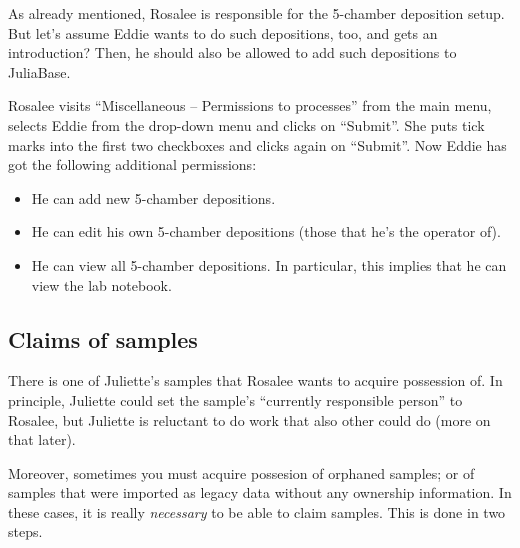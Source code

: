 \documentclass[a4paper,11pt,english]{sphinxmanual}
\begin{document}
As already mentioned, Rosalee is responsible for the 5-chamber deposition
setup.  But let's assume Eddie wants to do such depositions, too, and gets an
introduction?  Then, he should also be allowed to add such depositions to
JuliaBase.

Rosalee visits “Miscellaneous – Permissions to processes” from the main menu,
selects Eddie from the drop-down menu and clicks on “Submit”.  She puts tick
marks into the first two checkboxes and clicks again on “Submit”.  Now Eddie
has got the following additional permissions:
\begin{itemize}
\item {} 
He can add new 5-chamber depositions.

\item {} 
He can edit his own 5-chamber depositions (those that he's the operator of).

\item {} 
He can view all 5-chamber depositions.  In particular, this implies that he
can view the lab notebook.

\end{itemize}


\subsection{Claims of samples}
\label{demo:index-15}\label{demo:claims-of-samples}
There is one of Juliette's samples that Rosalee wants to acquire possession of.
In principle, Juliette could set the sample's “currently responsible person” to
Rosalee, but Juliette is reluctant to do work that also other could do (more on
that later).

Moreover, sometimes you must acquire possesion of orphaned samples; or of
samples that were imported as legacy data without any ownership information.
In these cases, it is really \emph{necessary} to be able to claim samples.  This is
done in two steps.

{\hfill{}}
\end{document}
